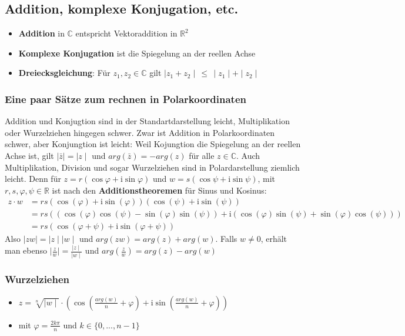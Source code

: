 \documentclass[titlepage]{article}
\newcommand{\C}{\mathbb{C}}
\newcommand{\R}{\mathbb{R}}
\newcommand{\1}{\mathbb{1}}
\newcommand{\0}{\mathbb{0}}
\begin{document}
				\subsection{Addition, komplexe Konjugation, etc.}
					\begin{itemize}
						\item \textbf{Addition} in $\C$ entspricht Vektoraddition in $\R^2$
						\item \textbf{Komplexe Konjugation} ist die Spiegelung an der reellen Achse
						\item \textbf{Dreiecksgleichung}: Für $z_1,z_2\in\C$ gilt $\mid z_1+z_2\mid\,\le\,\mid z_1\mid+\mid z_2\mid$
					\end{itemize}
				\subsubsection{Eine paar Sätze zum rechnen in Polarkoordinaten}
					Addition und Konjugtion sind in der Standartdarstellung leicht, Multiplikation oder Wurzelziehen hingegen schwer. Zwar ist Addition in Polarkoordinaten schwer, aber Konjungtion ist leicht: Weil Kojungtion die Spiegelung an der reellen Achse ist, gilt $\mid\bar z\mid=\mid z\mid$ und $arg(\bar z)=-arg(z)$ für alle $z\in\C$. Auch Multiplikation, Division und sogar Wurzelziehen sind in Polardarstellung ziemlich leicht. Denn für $z=r(\cos\varphi+\mathrm{i}\sin\varphi)$ und $w=s(\cos\psi+\mathrm{i}\sin\psi)$, mit $r,s,\varphi,\psi\in\R$ ist nach den \textbf{Additionstheoremen} für Sinus und Kosinus:
					\begin{align*}
						z\cdot w&=rs(\cos(\varphi)+\mathrm{i}\sin(\varphi))(\cos(\psi)+\mathrm{i}\sin(\psi))\\
						&=rs((\cos(\varphi)\cos(\psi)-\sin(\varphi)\sin(\psi))+\mathrm{i}(\cos(\varphi)\sin(\psi)+\sin(\varphi)\cos(\psi)))\\
						&=rs(\cos(\varphi+\psi)+\mathrm{i}\sin(\varphi+\psi))
					\end{align*}
					Also $\mid zw\mid= \mid z\mid\mid w\mid$ und $arg(zw)=arg(z)+arg(w)$. Falls $w\neq0$, erhält man ebenso $\mid \frac{z}{w}\mid=\frac{\mid z\mid}{\mid w\mid}$ und $arg(\frac{z}{w})=arg(z)-arg(w)$
				\subsubsection{Wurzelziehen}
					\begin{itemize}
						\item $z=\sqrt[n]{\mid w\mid}\cdot\left(\cos(\frac{arg(w)}{n}+\varphi)+\mathrm{i}\sin(\frac{arg(w)}{n}+\varphi)\right)$
						\item mit $\varphi=\frac{2k\pi}{n}$ und $k\in\{0,...,n-1\}$
					\end{itemize}
\end{document}
